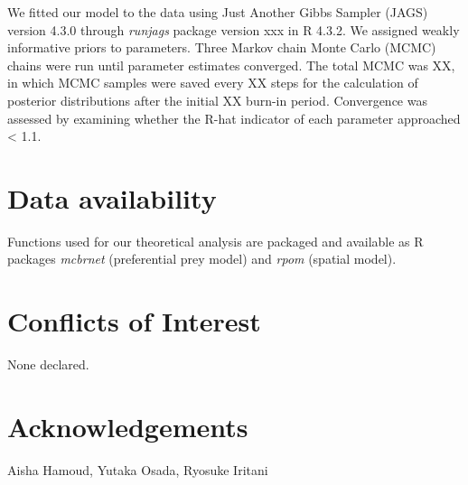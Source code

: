 \documentclass[11pt, class=article, crop=false]{standalone}
\begin{document}
We fitted our model to the data using Just Another Gibbs Sampler (JAGS) version 4.3.0 through \textit{runjags} package version xxx in R 4.3.2.
We assigned weakly informative priors to parameters.
Three Markov chain Monte Carlo (MCMC) chains were run until parameter estimates
converged.
The total MCMC was XX, in which MCMC samples were saved every XX steps for the calculation of posterior distributions after the initial XX burn-in period. 
Convergence was assessed by examining whether the R-hat indicator of each parameter approached < 1.1.

\section{Data availability}

Functions used for our theoretical analysis are packaged and available as R packages \textit{mcbrnet} (preferential prey model) and \textit{rpom} (spatial model).

\section{Conflicts of Interest}

None declared.

\section{Acknowledgements}

Aisha Hamoud, Yutaka Osada, Ryosuke Iritani


\end{document}
